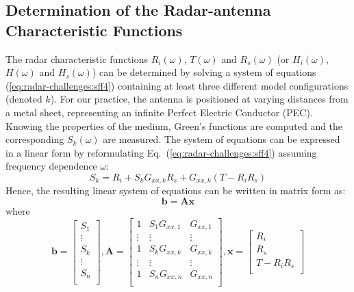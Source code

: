 \subsection{Determination of the Radar-antenna Characteristic Functions} \label{sec:radar-challenges:mathematical-theory:characteristic-functions}
The radar characteristic functions $R_i(\omega)$, $T(\omega)$ and $R_s(\omega)$ (or $H_i(\omega)$, $H(\omega)$ and $H_s(\omega)$) can be determined by solving a system of equations (\ref{eq:radar-challenges:sff4}) containing at least three different model configurations (denoted $k$). For our practice, the antenna is positioned at varying distances from a metal sheet, representing an infinite Perfect Electric Conductor (PEC). Knowing the properties of the medium, Green's functions are computed and the corresponding $S_{k}(\omega)$ are measured. The system of equations can be expressed in a linear form by reformulating Eq.~(\ref{eq:radar-challenges:sff4}) assuming frequency dependence $\omega$:
\begin{equation}\label{Art5S11r}
 S_{k} = R_i + S_{k}G_{xx,k}R_s + G_{xx,k} \left( T-R_iR_s \right)
\end{equation}
Hence, the resulting linear system of equations can be written in matrix form as:
\begin{equation}
\mathbf{b}=\mathbf{A}\mathbf{x}
\end{equation}
where
\begin{equation}
\mathbf{b}=
\begin{bmatrix}
 S_{1} \\
 \vdots \\
 S_{k} \\
 \vdots \\
 S_{n} \\
\end{bmatrix},
\mathbf{A}=
\begin{bmatrix}
 1 & S_{1}G_{xx,1} & G_{xx,1} \\
 \vdots & \vdots & \vdots \\
 1 & S_{k}G_{xx,k} & G_{xx,k} \\
 \vdots & \vdots & \vdots\\
  1 & S_{n}G_{xx,n} & G_{xx,n} \\
\end{bmatrix},
\mathbf{x}=
\begin{bmatrix}
 R_i \\
 R_s \\
 T-R_iR_s \\
\end{bmatrix}
\end{equation}
